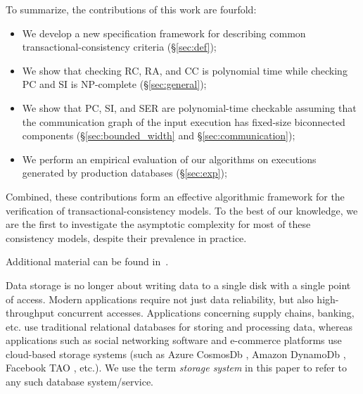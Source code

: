 To summarize, the contributions of this work are fourfold:
\begin{itemize}

  \item We develop a new specification framework for describing common transactional-consistency criteria (§\ref{sec:def});

  \item We show that checking RC, RA, and CC is polynomial time while checking PC and SI is NP-complete (§\ref{sec:general});

  \item We show that PC, SI, and SER are polynomial-time checkable assuming that the communication graph of the input execution has fixed-size biconnected components (§\ref{sec:bounded_width} and §\ref{sec:communication});
  
  \item We perform an empirical evaluation of our algorithms on executions generated by production databases (§\ref{sec:exp});

\end{itemize}
Combined, these contributions form an effective algorithmic framework for the verification of transactional-consistency models. To the best of our knowledge, we are the first to investigate the asymptotic complexity for most of these consistency models, despite their prevalence in practice.

Additional material can be found in~\cite{arxiv}. 




Data storage is no longer about writing data to a single
disk with a single point of access. Modern applications require not just data
reliability, but also high-throughput concurrent accesses. 
Applications concerning supply chains, banking, etc. use traditional relational databases
for storing and processing data, whereas applications such as social networking
software and e-commerce platforms 
use cloud-based storage systems (such as Azure CosmosDb \cite{cosmosdb}, Amazon DynamoDb
\cite{DBLP:conf/sosp/DeCandiaHJKLPSVV07}, Facebook TAO \cite{facebook-tao}, etc.). We use the term \textit{storage
system} in this paper to refer to any such database system/service.


 
